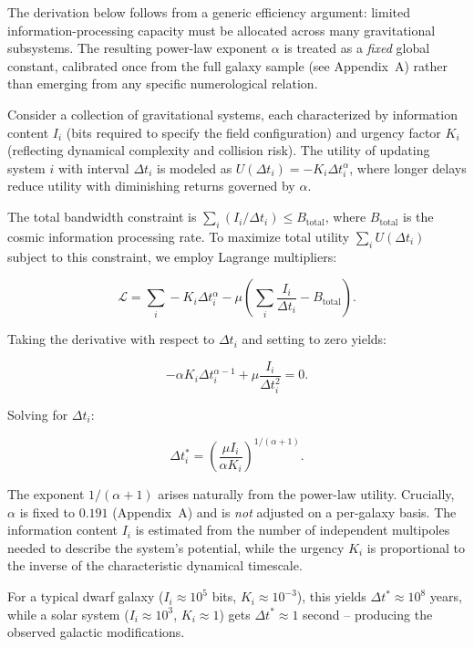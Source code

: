 \documentclass[fleqn,usenatbib]{mnras}
\begin{document}
The derivation below follows from a generic efficiency argument: limited information-processing capacity must be allocated across many gravitational subsystems.  The resulting power-law exponent $\alpha$ is treated as a \emph{fixed} global constant, calibrated once from the full galaxy sample (see Appendix~A) rather than emerging from any specific numerological relation.

Consider a collection of gravitational systems, each characterized by information content $I_i$ (bits required to specify the field configuration) and urgency factor $K_i$ (reflecting dynamical complexity and collision risk). The utility of updating system $i$ with interval $\Delta t_i$ is modeled as $U(\Delta t_i) = -K_i \Delta t_i^\alpha$, where longer delays reduce utility with diminishing returns governed by $\alpha$.

The total bandwidth constraint is $\sum_i (I_i / \Delta t_i) \leq B_\mathrm{total}$, where $B_\mathrm{total}$ is the cosmic information processing rate. To maximize total utility $\sum_i U(\Delta t_i)$ subject to this constraint, we employ Lagrange multipliers:

\begin{equation}
\mathcal{L} = \sum_i -K_i \Delta t_i^\alpha - \mu \left( \sum_i \frac{I_i}{\Delta t_i} - B_\mathrm{total} \right).
\end{equation}

Taking the derivative with respect to $\Delta t_i$ and setting to zero yields:

\begin{equation}
-\alpha K_i \Delta t_i^{\alpha-1} + \mu \frac{I_i}{\Delta t_i^2} = 0.
\end{equation}

Solving for $\Delta t_i$:

\begin{equation}
\Delta t_i^* = \left( \frac{\mu I_i}{\alpha K_i} \right)^{1/(\alpha+1)}.
\end{equation}

The exponent $1/(\alpha+1)$ arises naturally from the power-law utility. Crucially, $\alpha$ is fixed to $0.191$ (Appendix~A) and is \emph{not} adjusted on a per-galaxy basis. The information content $I_i$ is estimated from the number of independent multipoles needed to describe the system's potential, while the urgency $K_i$ is proportional to the inverse of the characteristic dynamical timescale.

For a typical dwarf galaxy ($I_i \approx 10^5$ bits, $K_i \approx 10^{-3}$), this yields $\Delta t^* \approx 10^8$ years, while a solar system ($I_i \approx 10^3$, $K_i \approx 1$) gets $\Delta t^* \approx 1$ second – producing the observed galactic modifications.
\end{document}
